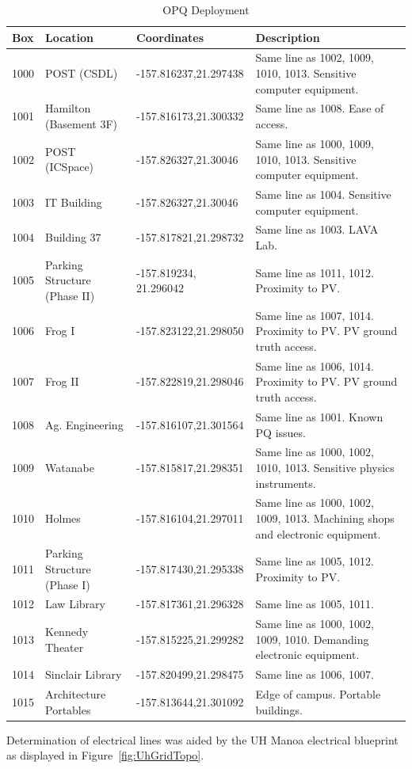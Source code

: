 \begin{table}[H]
	\centering
	\caption{OPQ Deployment}
	\begin{tabularx}{\textwidth}{lllX}
		\toprule
		\textbf{Box} & \textbf{Location} & \textbf{Coordinates} & \textbf{Description} \\
		\midrule
		1000 & POST (CSDL) & -157.816237,21.297438 & Same line as 1002, 1009, 1010, 1013. Sensitive computer equipment. \\
		1001 & Hamilton (Basement 3F) & -157.816173,21.300332 & Same line as 1008. Ease of access. \\
		1002 & POST (ICSpace) & -157.826327,21.30046 & Same line as 1000, 1009, 1010, 1013. Sensitive computer equipment.   \\
		1003 & IT Building & -157.826327,21.30046 & Same line as 1004. Sensitive computer equipment. \\
		1004 & Building 37 & -157.817821,21.298732 & Same line as 1003. LAVA Lab. \\
		1005 & Parking Structure (Phase II) & -157.819234, 21.296042 & Same line as 1011, 1012. Proximity to PV. \\
		1006 & Frog I & -157.823122,21.298050 & Same line as 1007, 1014. Proximity to PV. PV ground truth access. \\
		1007 & Frog II & -157.822819,21.298046 & Same line as 1006, 1014. Proximity to PV. PV ground truth access.  \\
		1008 & Ag. Engineering & -157.816107,21.301564 & Same line as 1001. Known PQ issues. \\
		1009 & Watanabe & -157.815817,21.298351 & Same line as 1000, 1002, 1010, 1013. Sensitive physics instruments. \\
		1010 & Holmes & -157.816104,21.297011 & Same line as 1000, 1002, 1009, 1013. Machining shops and electronic equipment. \\
		1011 & Parking Structure (Phase I) & -157.817430,21.295338 & Same line as 1005, 1012. Proximity to PV. \\
		1012 & Law Library & -157.817361,21.296328 & Same line as 1005, 1011. \\
		1013  & Kennedy Theater & -157.815225,21.299282 & Same line as 1000, 1002, 1009, 1010. Demanding electronic equipment. \\
		1014 & Sinclair Library & -157.820499,21.298475 & Same line as 1006, 1007. \\
		1015 & Architecture Portables & -157.813644,21.301092 & Edge of campus. Portable buildings. \\
		\bottomrule
	\end{tabularx}
	\label{table:OpqDeployment}
\end{table}
Determination of electrical lines was aided by the UH Manoa electrical blueprint as displayed in Figure~\ref{fig:UhGridTopo}.

